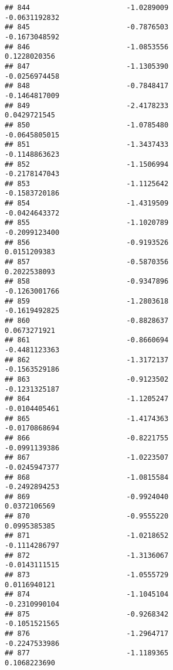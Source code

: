 \documentclass[
]{article}
\begin{document}
\begin{verbatim}
## 844                       -1.0289009                         -0.0631192832
## 845                       -0.7876503                         -0.1673048592
## 846                       -1.0853556                          0.1228020356
## 847                       -1.1305390                         -0.0256974458
## 848                       -0.7848417                         -0.1464817009
## 849                       -2.4178233                          0.0429721545
## 850                       -1.0785480                         -0.0645805015
## 851                       -1.3437433                         -0.1148863623
## 852                       -1.1506994                         -0.2178147043
## 853                       -1.1125642                         -0.1583720186
## 854                       -1.4319509                         -0.0424643372
## 855                       -1.1020789                         -0.2099123400
## 856                       -0.9193526                          0.0151209383
## 857                       -0.5870356                          0.2022538093
## 858                       -0.9347896                         -0.1263001766
## 859                       -1.2803618                         -0.1619492825
## 860                       -0.8828637                          0.0673271921
## 861                       -0.8660694                         -0.4481123363
## 862                       -1.3172137                         -0.1563529186
## 863                       -0.9123502                         -0.1231325187
## 864                       -1.1205247                         -0.0104405461
## 865                       -1.4174363                         -0.0170868694
## 866                       -0.8221755                         -0.0991139386
## 867                       -1.0223507                         -0.0245947377
## 868                       -1.0815584                         -0.2492894253
## 869                       -0.9924040                          0.0372106569
## 870                       -0.9555220                          0.0995385385
## 871                       -1.0218652                         -0.1114286797
## 872                       -1.3136067                         -0.0143111515
## 873                       -1.0555729                          0.0116940121
## 874                       -1.1045104                         -0.2310990104
## 875                       -0.9268342                         -0.1051521565
## 876                       -1.2964717                         -0.2247533986
## 877                       -1.1189365                          0.1068223690

\end{verbatim}
\end{document}
